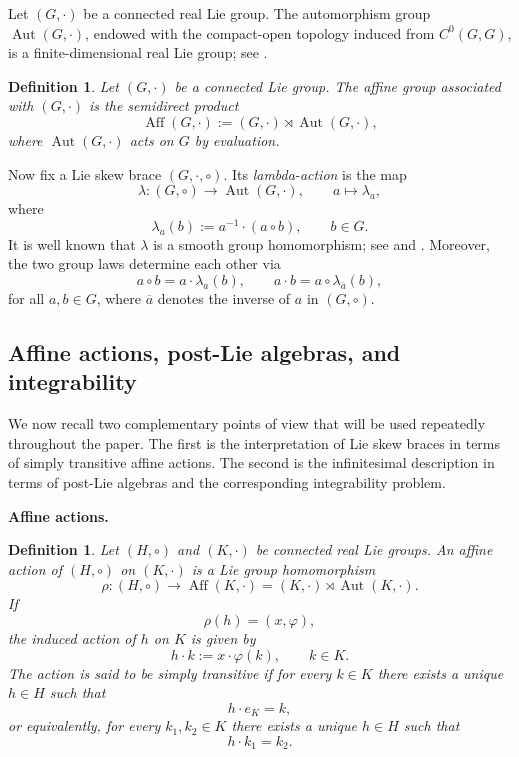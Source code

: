 \documentclass[reqno]{amsart}
\newtheorem{definition}[theorem]{Definition}
\DeclareMathOperator{\Aut}{Aut}
\DeclareMathOperator{\Aff}{Aff}
\begin{document}
\medskip

Let $(G,\cdot)$ be a connected real Lie group. The automorphism group
$\Aut(G,\cdot)$, endowed with the compact-open topology induced from $C^0(G,G)$,
is a finite-dimensional real Lie group; see \cite{Hochschild1952aut,Dani1992}.

\begin{definition}
Let $(G,\cdot)$ be a connected Lie group. The \emph{affine group} associated
with $(G,\cdot)$ is the semidirect product
\[
\Aff(G,\cdot):=(G,\cdot)\rtimes \Aut(G,\cdot),
\]
where $\Aut(G,\cdot)$ acts on $G$ by evaluation.
\end{definition}

Now fix a Lie skew brace $(G,\cdot,\circ)$. Its \emph{lambda-action} is the map
\begin{equation}\label{lambda}
\lambda:(G,\circ)\longrightarrow \Aut(G,\cdot),\qquad a\longmapsto \lambda_a,
\end{equation}
where
\begin{equation}\label{lambdaspec}
\lambda_a(b):=a^{-1}\cdot(a\circ b),\qquad b\in G.
\end{equation}
It is well known that $\lambda$ is a smooth group homomorphism; see
\cite[Cor.~1.10]{Guarnieri2017} and \cite[Lemma~2.4]{DameleLoi2026}. Moreover,
the two group laws determine each other via
\[
a\circ b=a\cdot \lambda_a(b),
\qquad
a\cdot b=a\circ \lambda_{\overline a}(b),
\]
for all $a,b\in G$, where $\overline a$ denotes the inverse of $a$ in
$(G,\circ)$.

\subsection{Affine actions, post-Lie algebras, and integrability}\label{subsec:affine-postlie}

We now recall two complementary points of view that will be used repeatedly
throughout the paper. The first is the interpretation of Lie skew braces in
terms of simply transitive affine actions. The second is the infinitesimal
description in terms of post-Lie algebras and the corresponding integrability
problem.

\medskip
\noindent
\textbf{Affine actions.}

\begin{definition}\label{def:affine-action}
Let $(H,\circ)$ and $(K,\cdot)$ be connected real Lie groups. An
\emph{affine action} of $(H,\circ)$ on $(K,\cdot)$ is a Lie group homomorphism
\[
\rho:(H,\circ)\longrightarrow \Aff(K,\cdot)
=(K,\cdot)\rtimes \Aut(K,\cdot).
\]
If
\[
\rho(h)=(x,\varphi),
\]
the induced action of $h$ on $K$ is given by
\[
h\cdot k:=x\cdot \varphi(k),
\qquad k\in K.
\]
The action is said to be \emph{simply transitive} if for every $k\in K$ there
exists a unique $h\in H$ such that
\[
h\cdot e_K=k,
\]
or equivalently, for every $k_1,k_2\in K$ there exists a unique $h\in H$ such
that
\[
h\cdot k_1=k_2.
\]
\end{definition}
\end{document}
